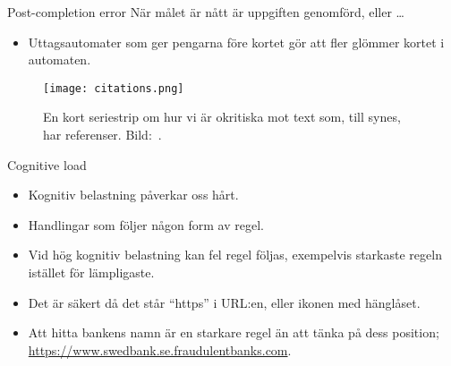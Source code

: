 \begin{frame}
  \begin{block}{Post-completion error}
    När målet är nått är uppgiften genomförd, eller \dots
  \end{block}

  \pause{}

  \begin{example}
    \begin{itemize}
      \item Uttagsautomater som ger pengarna före kortet gör att fler glömmer 
        kortet i automaten.
    \end{itemize}
  \end{example}
\end{frame}

\begin{frame}
  \begin{figure}
    \texttt{[image: citations.png]}
    \caption{En kort seriestrip om hur vi är okritiska mot text som, till 
    synes, har referenser.
    Bild:~\cite{xkcd906}.}
  \end{figure}
\end{frame}

\begin{frame}
  \begin{block}{Cognitive load}
    \begin{itemize}
      \item Kognitiv belastning påverkar oss hårt.
      \item Handlingar som följer någon form av regel.
      \item Vid hög kognitiv belastning kan fel regel följas, exempelvis 
        starkaste regeln istället för lämpligaste.
    \end{itemize}
  \end{block}
  
  \pause{}

  \begin{example}
    \begin{itemize}
      \item Det är säkert då det står \enquote{https} i URL:en, eller ikonen 
        med hänglåset.
      \item Att hitta bankens namn är en starkare regel än att tänka på dess 
        position; \url{https://www.swedbank.se.fraudulentbanks.com}.
    \end{itemize}
  \end{example}
\end{frame}

